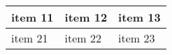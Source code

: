 \documentclass[14pt]{extarticle}
\begin{document}
\begin{tabu} to 0.8\textwidth { | X[l] | X[c] | X[r] | }
 \hline
 item 11 & item 12 & item 13 \\
 \hline
 item 21  & item 22  & item 23  \\
\hline
\end{tabu}
\end{document}
